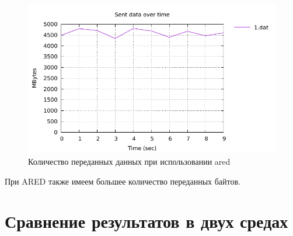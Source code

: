 \begin{figure}[!ht]
  \centering
  \includegraphics[width=0.6\linewidth]{image/ared/bytes_ared.pdf}
  \caption{Количество переданных данных при использовании ared}
  \label{fig:3.14}
\end{figure}

При ARED также имеем большее количество переданных байтов. 

\section{Сравнение результатов в двух средах}
